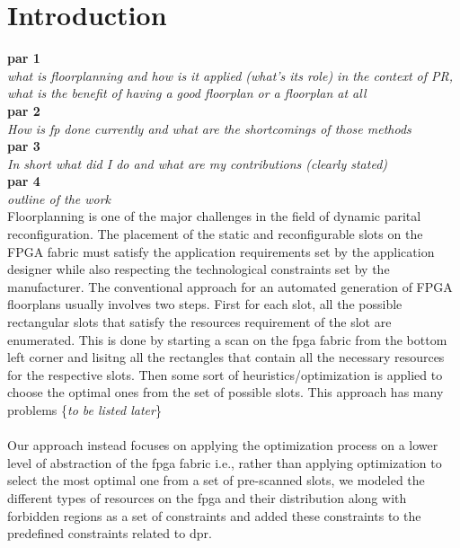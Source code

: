 \section{Introduction}
\textbf{par 1} \\
\textit{what is floorplanning and how is it applied (what's its role) in the context of PR, what is the benefit of having a good floorplan or a floorplan at all} \\

\textbf{par 2} \\
\textit{How is fp done currently and what are the shortcomings of those methods} \\

\textbf{par 3} \\
\textit{In short what did I do and what are my contributions (clearly stated)} \\

\textbf{par 4} \\
\textit{outline of the work} \\

Floorplanning is one of the major challenges in the field of dynamic parital reconfiguration. The placement of the static and reconfigurable slots on the FPGA fabric must satisfy the application requirements set by the application designer while also respecting the technological constraints set by the manufacturer. The conventional approach for an automated generation of FPGA floorplans usually involves two steps. First for each slot, all the possible rectangular slots that satisfy the resources requirement of the slot are enumerated. This is done by starting a scan on the fpga fabric from the bottom left corner and lisitng all the rectangles that contain all the necessary resources for the respective slots. Then some sort of heuristics/optimization is applied to choose the optimal ones from the set of possible slots. This approach has many problems \{\textit{to be listed later}\}\\\\

Our approach instead focuses on applying the optimization process on a lower level of abstraction of the fpga fabric i.e., rather than applying optimization to select the most optimal one from a set of pre-scanned slots, we modeled the different types of resources on the fpga and their distribution along with forbidden regions as a set of constraints and added these constraints to the predefined constraints related to dpr. \\

